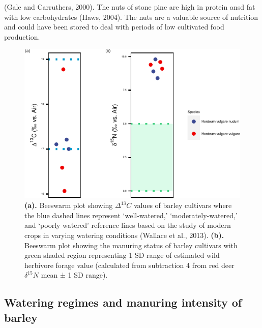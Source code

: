 \documentclass[5p]{elsarticle} %
\begin{document}
(Gale and Carruthers, 2000). The nuts of stone pine are high in protein ansd fat with low carbohydrates (Haws, 2004). The nuts are a valuable source of nutrition and could have been stored to deal with periods of low cultivated food production.



\begin{figure}
\centering
\includegraphics{castro_main_body_files/figure-latex/iso-hord-plots-1.pdf}
\caption{\label{fig:iso-hord-plots}\textbf{(a).} Beeswarm plot showing \(\Delta ^{13}C\) values of barley cultivars where the blue dashed lines represent `well-watered,' `moderately-watered,' and `poorly watered' reference lines based on the study of modern crops in varying watering conditions (Wallace et al., 2013). \textbf{(b).} Beeswarm plot showing the manuring status of barley cultivars with green shaded region representing 1 SD range of estimated wild herbivore forage value (calculated from subtraction 4 \permil from red deer \(\delta ^{15}N\) mean ± 1 SD range).}
\end{figure}

\hypertarget{watering-regimes-and-manuring-intensity-of-barley}{%
\subsection{Watering regimes and manuring intensity of barley}\label{watering-regimes-and-manuring-intensity-of-barley}}
\end{document}
